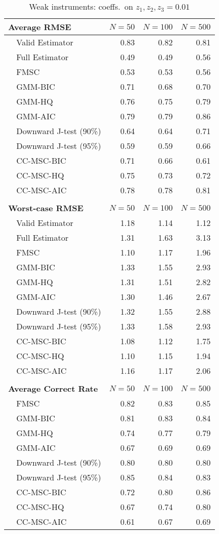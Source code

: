 \documentclass{article}
\begin{document}
%
\begin{table}[!tbp]
\caption{Weak instruments: coeffs.\ on $z_1, z_2, z_3 = 0.01$}
 \begin{center}
 \begin{tabular}{rlrrr}\hline\hline
\multicolumn{2}{l}{\textbf{Average RMSE}}&\multicolumn{1}{c}{$N=50$}&\multicolumn{1}{c}{$N=100$}&\multicolumn{1}{c}{$N=500$}\tabularnewline
\hline
&Valid Estimator&0.83&0.82&0.81\tabularnewline
&Full Estimator&0.49&0.49&0.56\tabularnewline
&FMSC&0.53&0.53&0.56\tabularnewline
&GMM-BIC&0.71&0.68&0.70\tabularnewline
&GMM-HQ&0.76&0.75&0.79\tabularnewline
&GMM-AIC&0.79&0.79&0.86\tabularnewline
&Downward J-test (90\%)&0.64&0.64&0.71\tabularnewline
&Downward J-test (95\%)&0.59&0.59&0.66\tabularnewline
&CC-MSC-BIC&0.71&0.66&0.61\tabularnewline
&CC-MSC-HQ&0.75&0.73&0.72\tabularnewline
&CC-MSC-AIC&0.78&0.78&0.81\tabularnewline
\\
\multicolumn{2}{l}{\textbf{Worst-case RMSE}}&\multicolumn{1}{c}{$N=50$}&\multicolumn{1}{c}{$N=100$}&\multicolumn{1}{c}{$N=500$}\tabularnewline
\hline
&Valid Estimator&1.18&1.14&1.12\tabularnewline
&Full Estimator&1.31&1.63&3.13\tabularnewline
&FMSC&1.10&1.17&1.96\tabularnewline
&GMM-BIC&1.33&1.55&2.93\tabularnewline
&GMM-HQ&1.31&1.51&2.82\tabularnewline
&GMM-AIC&1.30&1.46&2.67\tabularnewline
&Downward J-test (90\%)&1.32&1.55&2.88\tabularnewline
&Downward J-test (95\%)&1.33&1.58&2.93\tabularnewline
&CC-MSC-BIC&1.08&1.12&1.75\tabularnewline
&CC-MSC-HQ&1.10&1.15&1.94\tabularnewline
&CC-MSC-AIC&1.16&1.17&2.06\tabularnewline
\\
\multicolumn{2}{l}{\textbf{Average Correct Rate}}&\multicolumn{1}{c}{$N=50$}&\multicolumn{1}{c}{$N=100$}&\multicolumn{1}{c}{$N=500$}\tabularnewline
\hline
&FMSC&0.82&0.83&0.85\tabularnewline
&GMM-BIC&0.81&0.83&0.84\tabularnewline
&GMM-HQ&0.74&0.77&0.79\tabularnewline
&GMM-AIC&0.67&0.69&0.69\tabularnewline
&Downward J-test (90\%)&0.80&0.80&0.80\tabularnewline
&Downward J-test (95\%)&0.85&0.84&0.83\tabularnewline
&CC-MSC-BIC&0.72&0.80&0.86\tabularnewline
&CC-MSC-HQ&0.67&0.74&0.80\tabularnewline
&CC-MSC-AIC&0.61&0.67&0.69\tabularnewline
\hline
\end{tabular}

\end{center}

\end{table}
\end{document}
